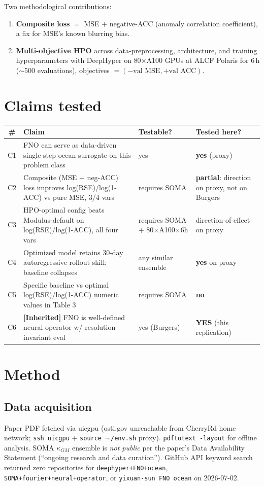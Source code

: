 \documentclass[11pt]{article}
\begin{document}
Two methodological contributions:
\begin{enumerate}
  \item \textbf{Composite loss} $=$ MSE $+$ negative-ACC (anomaly correlation coefficient), a
        fix for MSE's known blurring bias.
  \item \textbf{Multi-objective HPO} across data-preprocessing, architecture, and training
        hyperparameters with DeepHyper on 80$\times$A100 GPUs at ALCF Polaris for 6\,h
        ($\sim$500 evaluations), objectives $=(-\text{val MSE}, +\text{val ACC})$.
\end{enumerate}

\section{Claims tested}
\begin{longtable}{clll}
\toprule
\# & Claim & Testable? & Tested here? \\
\midrule
C1 & FNO can serve as data-driven single-step ocean surrogate on this problem class & yes & \textbf{yes} (proxy) \\
C2 & Composite (MSE + neg-ACC) loss improves log(RSE)/log(1-ACC) vs pure MSE, 3/4 vars & requires SOMA & \textbf{partial}: direction on proxy, not on Burgers \\
C3 & HPO-optimal config beats Modulus-default on log(RSE)/log(1-ACC), all four vars & requires SOMA + 80$\times$A100$\times$6h & direction-of-effect on proxy \\
C4 & Optimized model retains 30-day autoregressive rollout skill; baseline collapses & any similar ensemble & \textbf{yes} on proxy \\
C5 & Specific baseline vs optimal log(RSE)/log(1-ACC) numeric values in Table 3 & requires SOMA & \textbf{no} \\
C6 & \textbf{[Inherited]} FNO is well-defined neural operator w/ resolution-invariant eval & yes (Burgers) & \textbf{YES} (this replication) \\
\bottomrule
\end{longtable}

\section{Method}
\subsection{Data acquisition}
Paper PDF fetched via uicgpu (osti.gov unreachable from CherryRd home network; \texttt{ssh uicgpu}
$+$ \texttt{source $\sim$/env.sh} proxy). \texttt{pdftotext -layout} for offline analysis. SOMA
$\kappa_{GM}$ ensemble is \emph{not public} per the paper's Data Availability Statement
(``ongoing research and data curation''). GitHub API keyword search returned zero repositories
for \texttt{deephyper+FNO+ocean}, \texttt{SOMA+fourier+neural+operator}, or
\texttt{yixuan-sun FNO ocean} on 2026-07-02.
\end{document}
